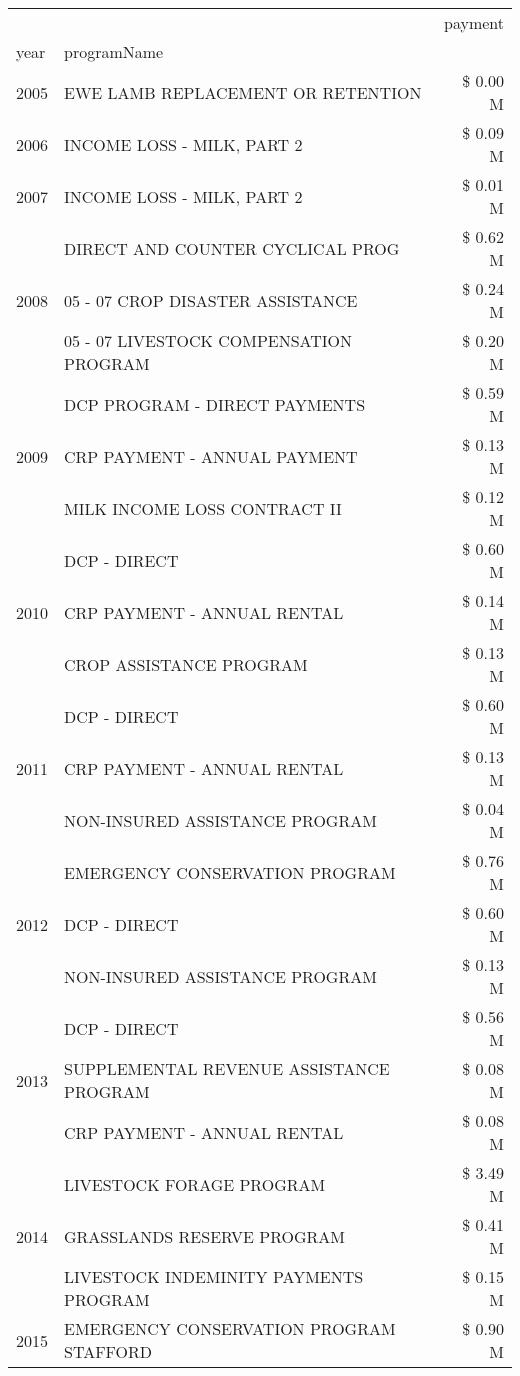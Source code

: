 \begin{tabular}{llr}
\toprule
 &  & payment \\
year & programName &  \\
\midrule
2005 & EWE LAMB REPLACEMENT OR RETENTION & \$ 0.00 M \\
\cline{1-3}
2006 & INCOME LOSS - MILK, PART 2 & \$ 0.09 M \\
\cline{1-3}
2007 & INCOME LOSS - MILK, PART 2 & \$ 0.01 M \\
\cline{1-3}
\multirow[t]{3}{*}{2008} & DIRECT AND COUNTER CYCLICAL PROG & \$ 0.62 M \\
 & 05 - 07 CROP DISASTER ASSISTANCE & \$ 0.24 M \\
 & 05 - 07 LIVESTOCK COMPENSATION PROGRAM & \$ 0.20 M \\
\cline{1-3}
\multirow[t]{3}{*}{2009} & DCP PROGRAM - DIRECT PAYMENTS & \$ 0.59 M \\
 & CRP PAYMENT - ANNUAL PAYMENT & \$ 0.13 M \\
 & MILK INCOME LOSS CONTRACT II & \$ 0.12 M \\
\cline{1-3}
\multirow[t]{3}{*}{2010} & DCP - DIRECT & \$ 0.60 M \\
 & CRP PAYMENT - ANNUAL RENTAL & \$ 0.14 M \\
 & CROP ASSISTANCE PROGRAM & \$ 0.13 M \\
\cline{1-3}
\multirow[t]{3}{*}{2011} & DCP - DIRECT & \$ 0.60 M \\
 & CRP PAYMENT - ANNUAL RENTAL & \$ 0.13 M \\
 & NON-INSURED ASSISTANCE PROGRAM & \$ 0.04 M \\
\cline{1-3}
\multirow[t]{3}{*}{2012} & EMERGENCY CONSERVATION PROGRAM & \$ 0.76 M \\
 & DCP - DIRECT & \$ 0.60 M \\
 & NON-INSURED ASSISTANCE PROGRAM & \$ 0.13 M \\
\cline{1-3}
\multirow[t]{3}{*}{2013} & DCP - DIRECT & \$ 0.56 M \\
 & SUPPLEMENTAL REVENUE ASSISTANCE PROGRAM & \$ 0.08 M \\
 & CRP PAYMENT - ANNUAL RENTAL & \$ 0.08 M \\
\cline{1-3}
\multirow[t]{3}{*}{2014} & LIVESTOCK FORAGE PROGRAM & \$ 3.49 M \\
 & GRASSLANDS RESERVE PROGRAM & \$ 0.41 M \\
 & LIVESTOCK INDEMINITY PAYMENTS PROGRAM & \$ 0.15 M \\
\cline{1-3}
\multirow[t]{3}{*}{2015} & EMERGENCY CONSERVATION PROGRAM STAFFORD & \$ 0.90 M \\

\end{tabular}
